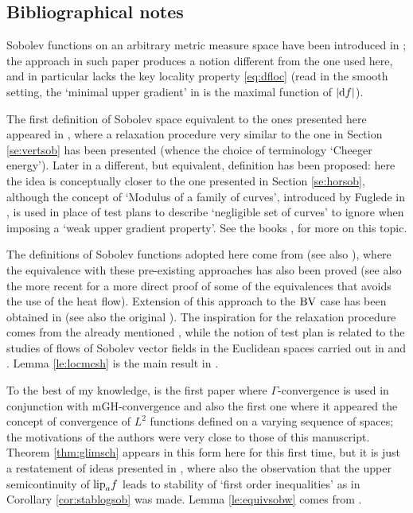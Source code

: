 \documentclass[11pt]{article}
\numberwithin{equation}{section}
\newcommand{\BV}{{\rm BV}}
\renewcommand{\d}{{\rm d}}
\newcommand{\lipa}{{\rm lip}_a}
\begin{document}
\subsection{Bibliographical notes}\label{se:bibliorcd}
{\footnotesize{Sobolev  functions on an arbitrary metric measure space have been introduced in \cite{HajSob}; the approach in such paper produces a notion different from the one used here, and in particular lacks the key locality property \eqref{eq:dfloc} (read in the smooth setting, the `minimal upper gradient' in  \cite{HajSob} is the maximal function of $|\d f|$).

The first definition of Sobolev space equivalent to the ones presented here appeared in \cite{Cheeger00}, where a relaxation procedure very similar to the one in Section \ref{se:vertsob} has been presented (whence the choice of terminology `Cheeger energy'). Later in \cite{Shanmugalingam00} a different, but equivalent, definition has been proposed: here the idea is conceptually closer to the one presented in Section \ref{se:horsob}, although the concept of `Modulus of a family of curves', introduced by Fuglede in \cite{Fugl57},  is used in place of test plans  to describe `negligible set of curves' to ignore when imposing a `weak upper gradient property'. See the books \cite{HKST15}, \cite{Bjorn-Bjorn11} for more on this topic.

The definitions of Sobolev functions adopted here come from \cite{AmbrosioGigliSavare11} (see also \cite{AmbrosioGigliSavare11-3}), where the equivalence with these pre-existing approaches has also been proved (see also the more recent \cite{EB23} for a more direct proof of some of the equivalences that avoids the use of the heat flow). Extension of this approach to the $\BV$ case has been obtained in \cite{Ambrosio-DiMarino14} (see also the original  \cite{Mir03}). The inspiration for the relaxation procedure comes from the already mentioned \cite{Cheeger00}, while the notion of test plan is related to the studies of flows of Sobolev vector fields in the Euclidean spaces carried out in \cite{DiPerna-Lions89} and \cite{Ambrosio04}. Lemma \ref{le:locmcsh} is the main result in \cite{GDMP}.  

To the best of my knowledge, \cite{KS03conv} is the first paper where $\Gamma$-convergence is used in conjunction with mGH-convergence and also the first one where it appeared the concept of convergence of $L^2$ functions defined on a varying sequence of spaces; the motivations of the authors were very close to those of this manuscript. Theorem \ref{thm:glimsch} appears in this form here for this first time, but it is just a restatement of ideas presented in \cite{AmbrosioGigliSavare11-3}, where also the observation that the upper semicontinuity of $\lipa f$ leads to stability of `first order inequalities' as in Corollary \ref{cor:stablogsob} was made. Lemma \ref{le:equivsobw} comes from \cite[Theorem 2.1.12]{GP19}.



}}
\end{document}

